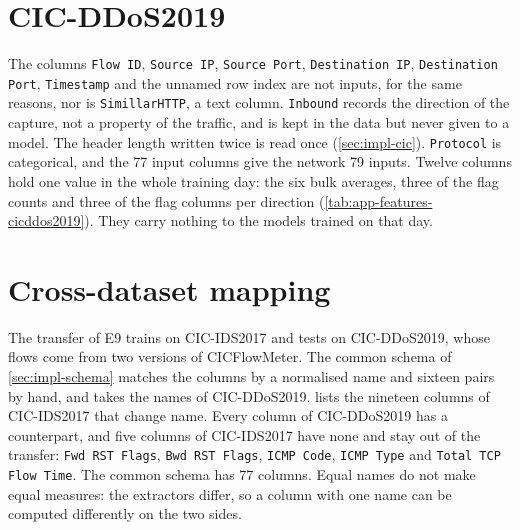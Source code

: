 \section{CIC-DDoS2019}

The columns \texttt{Flow ID}, \texttt{Source IP}, \texttt{Source Port}, \texttt{Destination IP},
\texttt{Destination Port}, \texttt{Timestamp} and the unnamed row index are not inputs, for the
same reasons, nor is \texttt{SimillarHTTP}, a text column. \texttt{Inbound} records the direction of the capture, not a
property of the traffic, and is kept in the data but never given to a model. The header length
written twice is read once (\cref{sec:impl-cic}). \texttt{Protocol} is categorical, and the 77
input columns give the network 79 inputs. Twelve columns hold one value in the whole training day:
the six bulk averages, three of the flag counts and three of the flag columns per direction
(\cref{tab:app-features-cicddos2019}). They carry nothing to the models trained on that day.

\section{Cross-dataset mapping}

The transfer of E9 trains on CIC-IDS2017 and tests on CIC-DDoS2019, whose flows come from two
versions of CICFlowMeter. The common schema of \cref{sec:impl-schema} matches the columns by a
normalised name and sixteen pairs by hand, and takes the names of CIC-DDoS2019.
 lists the nineteen columns of CIC-IDS2017 that change name. Every
column of CIC-DDoS2019 has a counterpart, and five columns of CIC-IDS2017 have none and stay out
of the transfer: \texttt{Fwd RST Flags}, \texttt{Bwd RST Flags}, \texttt{ICMP Code},
\texttt{ICMP Type} and \texttt{Total TCP Flow Time}. The common schema has 77 columns. Equal names do not
make equal measures: the extractors differ, so a column with one name can be computed differently
on the two sides.


